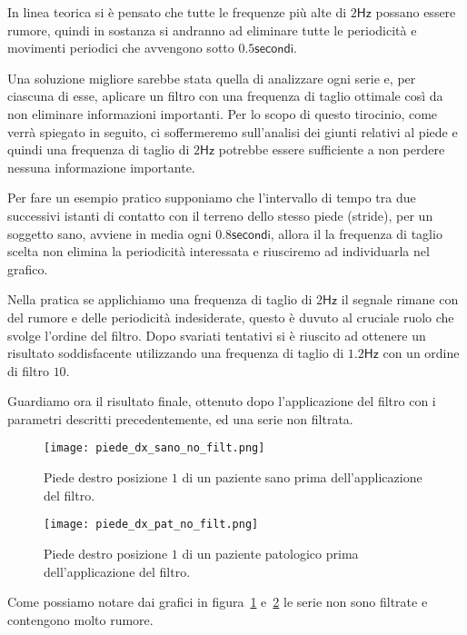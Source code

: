 In linea teorica si è pensato che tutte le frequenze più alte di $2\mathsf{Hz}$ possano essere rumore,
quindi in sostanza si andranno ad eliminare tutte le periodicità e movimenti periodici 
che avvengono sotto $0.5 \mathsf{secondi}$. 

Una soluzione migliore sarebbe stata quella di analizzare
ogni serie e, per ciascuna di esse, aplicare un filtro con una frequenza di taglio ottimale così da
non eliminare informazioni importanti. Per lo scopo di questo tirocinio, come verrà spiegato in seguito,
ci soffermeremo sull'analisi dei giunti relativi al piede e quindi una frequenza di taglio di $2\mathsf{Hz}$
potrebbe essere sufficiente a non perdere nessuna informazione importante.


Per fare un esempio pratico supponiamo che l'intervallo di tempo tra due successivi istanti di contatto con il
terreno dello stesso piede (stride), per un soggetto sano, avviene in media ogni $0.8\mathsf{secondi}$,
allora il la frequenza di taglio scelta non elimina la periodicità interessata e riusciremo 
ad individuarla nel grafico.

Nella pratica se applichiamo una frequenza di taglio di $2\mathsf{Hz}$ il segnale rimane con del rumore
e delle periodicità indesiderate, questo è duvuto al cruciale ruolo che svolge l'ordine del filtro.
Dopo svariati tentativi si è riuscito ad ottenere un risultato soddisfacente utilizzando una frequenza
di taglio di $1.2\mathsf{Hz}$ con un ordine di filtro $10$.

Guardiamo ora il risultato finale, ottenuto dopo l'applicazione del filtro con i parametri descritti
precedentemente, ed una serie non filtrata.


\begin{figure}[H]
    \centering
    \texttt{[image: piede\_dx\_sano\_no\_filt.png]}
    \caption{Piede destro posizione $1$ di un paziente sano prima dell'applicazione del filtro.}
    \label{fig:piede_dx_1_sano_no_filt}
\end{figure}

\begin{figure}[H]
    \centering
    \texttt{[image: piede\_dx\_pat\_no\_filt.png]}
    \caption{Piede destro posizione $1$ di un paziente patologico prima dell'applicazione del filtro.}
    \label{fig:piede_dx_1_pat_no_filt}
\end{figure}

Come possiamo notare dai grafici in figura~\ref{fig:piede_dx_1_sano_no_filt} 
e~\ref{fig:piede_dx_1_pat_no_filt} le serie non sono filtrate e contengono molto rumore.

